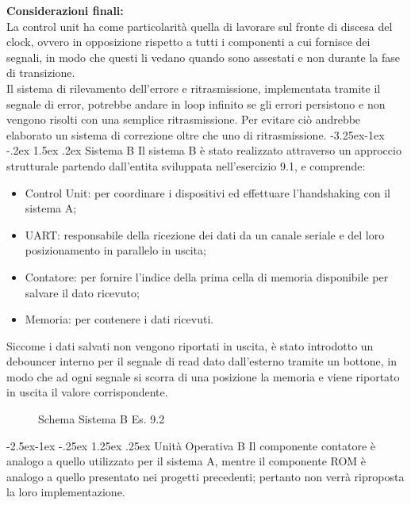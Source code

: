 \documentclass[12pt]{article}
\makeatletter
\renewcommand\paragraph{\@startsection{paragraph}{4}{\z@}%
            {-2.5ex\@plus -1ex \@minus -.25ex}%
            {1.25ex \@plus .25ex}%
            {\normalfont\large\bfseries}}
\renewcommand\subsubsection{\@startsection{subsubsection}{3}{\z@}%
            {-3.25ex\@plus -1ex \@minus -.2ex}%
            {1.5ex \@plus .2ex}%
            {\normalfont\large\bfseries}}
\def \Enove {Allegati/Esercizio9/}
\makeatother
\begin{document}
\clearpage
{\large \textbf{Considerazioni finali:}}
\\La control unit ha come particolarità quella di lavorare sul fronte di discesa del clock, ovvero in opposizione rispetto a tutti i componenti a cui fornisce dei segnali, in modo che questi li vedano quando sono assestati e non durante la fase di transizione.
\\Il sistema di rilevamento dell’errore e ritrasmissione, implementata tramite il segnale di error, potrebbe andare in loop infinito se gli errori persistono e non vengono risolti con una semplice ritrasmissione. Per evitare ciò andrebbe elaborato un sistema di correzione oltre che uno di ritrasmissione.
\subsubsection{Sistema B}
Il sistema B è stato realizzato attraverso un approccio strutturale partendo dall’entita sviluppata nell’esercizio 9.1, e comprende:
\begin{itemize}
    \item Control Unit: per coordinare i dispositivi ed effettuare l’handshaking con il sistema A;
    \item UART: responsabile della ricezione dei dati da un canale seriale e del loro posizionamento in parallelo in uscita;
    \item Contatore: per fornire l’indice della prima cella di memoria disponibile per salvare il dato ricevuto;
    \item Memoria: per contenere i dati ricevuti.
\end{itemize}
Siccome i dati salvati non vengono riportati in uscita, è stato introdotto un debouncer interno per il segnale di read dato dall’esterno tramite un bottone, in modo che ad ogni segnale si scorra di una posizione la memoria e viene riportato in uscita il valore corrispondente.
\clearpage
\begin{figure}[ht!]
    \centering
    
    \caption{Schema Sistema B Es. 9.2}
\end{figure}
\paragraph{Unità Operativa B}
Il componente contatore è analogo a quello utilizzato per il sistema A, mentre il componente ROM è analogo a quello presentato nei progetti precedenti; pertanto non verrà riproposta la loro implementazione.
\clearpage
\end{document}
